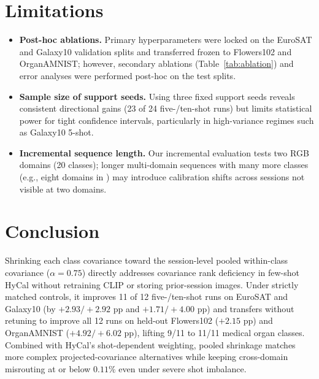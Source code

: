 \documentclass[letterpaper]{article} %
\begin{document}
\section{Limitations}

\begin{itemize}
\item \textbf{Post-hoc ablations.} Primary hyperparameters were locked on the EuroSAT and Galaxy10 validation splits and transferred frozen to Flowers102 and OrganAMNIST; however, secondary ablations (Table~\ref{tab:ablation}) and error analyses were performed post-hoc on the test splits.
\item \textbf{Sample size of support seeds.} Using three fixed support seeds reveals consistent directional gains (23 of 24 five-/ten-shot runs) but limits statistical power for tight confidence intervals, particularly in high-variance regimes such as Galaxy10 5-shot.
\item \textbf{Incremental sequence length.} Our incremental evaluation tests two RGB domains (20 classes); longer multi-domain sequences with many more classes (e.g., eight domains in \citet{lee2026hycal}) may introduce calibration shifts across sessions not visible at two domains.
\end{itemize}

\section{Conclusion}

Shrinking each class covariance toward the session-level pooled within-class covariance ($\alpha = 0.75$) directly addresses covariance rank deficiency in few-shot HyCal without retraining CLIP or storing prior-session images. Under strictly matched controls, it improves 11 of 12 five-/ten-shot runs on EuroSAT and Galaxy10 (by $+2.93 / +2.92$ pp and $+1.71 / +4.00$ pp) and transfers without retuning to improve all 12 runs on held-out Flowers102 ($+2.15$ pp) and OrganAMNIST ($+4.92 / +6.02$ pp), lifting 9/11 to 11/11 medical organ classes. Combined with HyCal's shot-dependent weighting, pooled shrinkage matches more complex projected-covariance alternatives while keeping cross-domain misrouting at or below $0.11\%$ even under severe shot imbalance.


\end{document}
